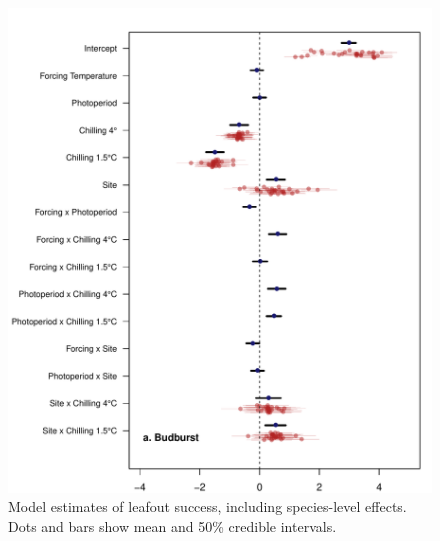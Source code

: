 \documentclass{article}
\begin{document}
\begin{figure}
\label{figS8}
\includegraphics[width=1\textwidth, page=2]{NonBBLO_sp}
\caption{Model estimates of leafout success, including species-level effects. Dots and bars show mean and 50\% credible intervals.}
\end{figure}
\end{document}
